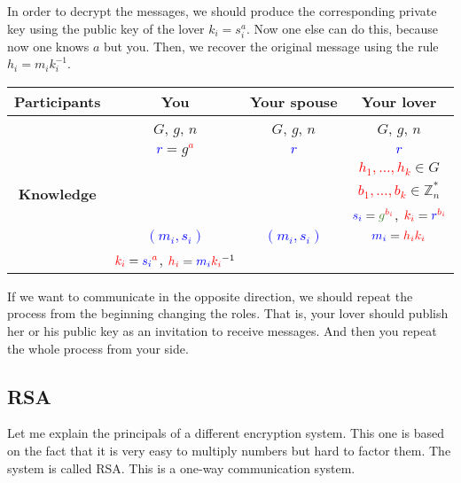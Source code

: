 In order to decrypt  the messages, we should produce the corresponding private key using the public key of the lover $k_i = s_i^a$. Now one else can do this, because now one knows $a$ but you. Then, we recover the original message using the rule $h_i = m_i k_i^{-1}$.
\begin{center}
\begin{tabular}{|c|c|c|c|}
\hline
{\bf Participants}&{You}&{Your spouse}&{Your lover}\\
\hline
\multirow{7}{*}{\bf Knowledge}&{\textcolor{OliveGreen}{$G$}, \textcolor{OliveGreen}{$g$}, \textcolor{OliveGreen}{$n$}}&{\textcolor{OliveGreen}{$G$}, \textcolor{OliveGreen}{$g$}, \textcolor{OliveGreen}{$n$}}&{\textcolor{OliveGreen}{$G$}, \textcolor{OliveGreen}{$g$}, \textcolor{OliveGreen}{$n$}}\\
{}&{ \textcolor{blue}{$r$}$=$\textcolor{OliveGreen}{$ g$}\textcolor{red}{${}^a$}}&{\textcolor{blue}{$r$}}&{\textcolor{blue}{$r$}}\\
{}&{}&{}&{\textcolor{red}{$h_1,\ldots,h_k$}$\in G$}\\
{}&{}&{}&{\textcolor{red}{$b_1,\ldots,b_k$}$\in \mathbb Z_n^*$}\\
{}&{}&{}&{$\textcolor{blue}{s_i} = \textcolor{OliveGreen}{g}^{\textcolor{red}{b_i}}$, $\textcolor{red}{k_i} = \textcolor{blue}{r}^{\textcolor{red}{b_i}}$}\\
{}&{\textcolor{blue}{$(m_i, s_i)$}}&{\textcolor{blue}{$(m_i, s_i)$}}&{$\textcolor{blue}{m_i} = \textcolor{red}{h_i k_i}$}\\
{}&{$\textcolor{red}{k_i} = \textcolor{blue}{s_i}^{\textcolor{red}{a}}$, $\textcolor{red}{h_i} = \textcolor{blue}{m_i} \textcolor{red}{k_i}^{-1}$}&{}&{}\\
\hline
\end{tabular}
\end{center}

If we want to communicate in the opposite direction, we should repeat the process from the beginning changing the roles. That is, your lover should publish her or his public key as an invitation to receive messages. And then you repeat the whole process from your side.

\subsection{RSA}

Let me explain the principals of a different encryption system. This one is based on the fact that it is very easy to multiply numbers but hard to factor them. The system is called RSA. This is a one-way communication system.

